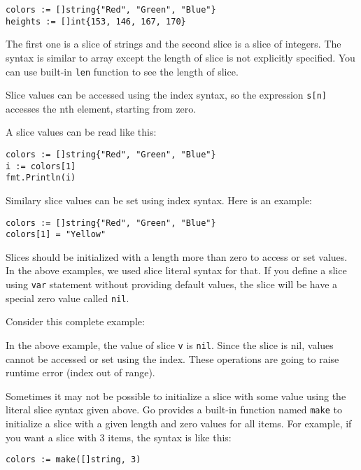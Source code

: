 \begin{lstlisting}[numbers=none]
colors := []string{"Red", "Green", "Blue"}
heights := []int{153, 146, 167, 170}
\end{lstlisting}

The first one is a slice of strings and the second slice is a slice of
integers.  The syntax is similar to array except the length of slice
is not explicitly specified.  You can use built-in \texttt{len}
function to see the length of slice.

Slice values can be accessed using the index syntax, so the expression
\texttt{s[n]} accesses the nth element, starting from zero.

A slice values can be read like this:

\begin{lstlisting}[numbers=none]
colors := []string{"Red", "Green", "Blue"}
i := colors[1]
fmt.Println(i)
\end{lstlisting}

Similary slice values can be set using index syntax.  Here is an
example:

\begin{lstlisting}[numbers=none]
colors := []string{"Red", "Green", "Blue"}
colors[1] = "Yellow"
\end{lstlisting}

Slices should be initialized with a length more than zero to access or
set values.  In the above examples, we used slice literal syntax for
that.  If you define a slice using \texttt{var} statement without
providing default values, the slice will be have a special zero value
called \texttt{nil}.

Consider this complete example:



In the above example, the value of slice \texttt{v} is \texttt{nil}.
Since the slice is nil, values cannot be accessed or set using the
index.  These operations are going to raise runtime error (index out
of range).

Sometimes it may not be possible to initialize a slice with some value
using the literal slice syntax given above.  Go provides a built-in
function named \texttt{make} to initialize a slice with a given length
and zero values for all items.  For example, if you want a slice with
3 items, the syntax is like this:

\begin{lstlisting}[numbers=none]
colors := make([]string, 3)
\end{lstlisting}

